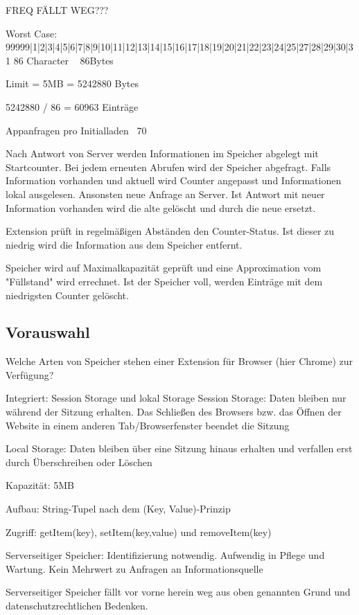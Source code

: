 FREQ FÄLLT WEG???

Worst Case:
99999|1|2|3|4|5|6|7|8|9|10|11|12|13|14|15|16|17|18|19|20|21|22|23|24|25|27|28|29|30|31
86 Character ~ 86Bytes

Limit = 5MB = 5242880 Bytes

5242880 / 86 = 60963 Einträge

Appanfragen pro Initialladen ~70


Nach Antwort von Server werden Informationen im Speicher abgelegt mit Startcounter.
Bei jedem erneuten Abrufen wird der Speicher abgefragt. Falls Information vorhanden und aktuell wird Counter angepasst und Informationen lokal ausgelesen. Ansonsten neue Anfrage an Server. Ist Antwort mit neuer Information vorhanden wird die alte gelöscht und durch die neue ersetzt.

Extension prüft in regelmäßigen Abständen den Counter-Status. Ist dieser zu niedrig wird die Information aus dem Speicher entfernt.

Speicher wird auf Maximalkapazität geprüft und eine Approximation vom "Füllstand" wird errechnet. Ist der Speicher voll, werden Einträge mit dem niedrigsten Counter gelöscht.



\subsection{Vorauswahl}

Welche Arten von Speicher stehen einer Extension für Browser (hier Chrome) zur Verfügung?

Integriert: Session Storage und lokal Storage
Session Storage: Daten bleiben nur während der Sitzung erhalten. Das Schließen des Browsers bzw. das Öffnen der Website in einem anderen Tab/Browserfenster beendet die Sitzung

Local Storage: Daten bleiben über eine Sitzung hinaus erhalten und verfallen erst durch Überschreiben oder Löschen

Kapazität: 5MB

Aufbau: String-Tupel nach dem (Key, Value)-Prinzip

Zugriff: getItem(key), setItem(key,value) und removeItem(key)


Serverseitiger Speicher:
Identifizierung notwendig. Aufwendig in Pflege und Wartung. Kein Mehrwert zu Anfragen an Informationsquelle

Serverseitiger Speicher fällt vor vorne herein weg aus oben genannten Grund und datenschutzrechtlichen Bedenken.


